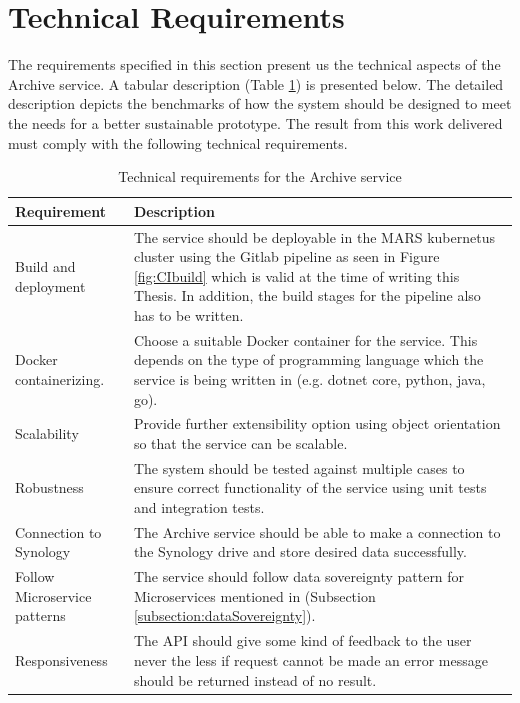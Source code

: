 \section{Technical Requirements}
\label{section:technicalReq}
The requirements specified in this section present us the technical aspects of the Archive service. A tabular description 
(Table \ref{table: Technical Requirements}) is presented below.
The detailed description depicts the benchmarks of how the system should be designed to meet the needs for a better sustainable prototype.
The result from this work delivered must comply with the following technical requirements.

    \begin{table}[h!]
        \centering
        \begin{tabular}{|p{3cm}|p{12cm}|}
            \hline
                \textbf{Requirement}  & \textbf{Description}\\
            \hline
                 Build and deployment & 
                 The service should be deployable in the MARS kubernetus \cite{kubernetes} cluster using the Gitlab pipeline as seen in Figure \ref{fig:CIbuild}
                 which is valid at the time of writing this Thesis. In addition,
                 the build stages for the pipeline also has to be written. \\
            \hline
                Docker containerizing.
                & Choose a suitable Docker container \cite[p.~7 - 8]{Torre2017} for the service. This depends on the type of programming language which 
                the service is being
                written in (e.g. dotnet core, python, java, go).\\
            \hline
                 Scalability & Provide further extensibility option using object orientation so that the service can be scalable.\\
            \hline
                 Robustness & The system should be tested against multiple cases to ensure correct functionality of the service using unit tests and
                 integration tests.\\    
            \hline
                 Connection to Synology & The Archive service should be able to make a connection to the Synology drive and store desired data successfully.\\    
            \hline
                Follow Microservice patterns & The service should follow data sovereignty pattern for Microservices mentioned in 
                (Subsection \ref{subsection:dataSovereignty}).\\ 
            \hline
                Responsiveness & The API should give some kind of feedback to the user never the less if request cannot be made an 
                error message should be returned instead of no result. \\      
            \hline
        \end{tabular}
        \caption{Technical requirements for the Archive service}
        \label{table: Technical Requirements}     
    \end{table}    
  
